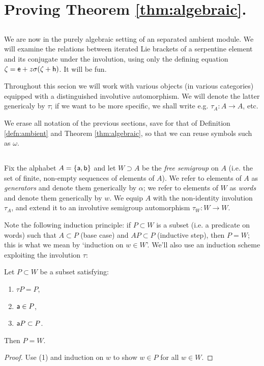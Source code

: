 \section{Proving Theorem \ref{thm:algebraic}.}
\label{sec:proving}
\subsection*{}
We are now in the purely algebraic setting of an separated ambient module.
We will examine the relations between iterated Lie brackets of a serpentine
element and its conjugate under the involution, using only the defining
equation $\zeta = \mathsf{e} + z \sigma(\zeta + \mathsf{h})$. It will be fun.

Throughout this secion we will work with various objects (in various
categories) equipped with a distinguished involutive automorphism. We will
denote the latter genericaly by $\tau$; if we want to be more specific, we shall
write e.g. $\tau_A : A \to A$, etc.

We erase all notation of the previous sections, save for that of
Definition \ref{defn:ambient} and Theorem \ref{thm:algebraic}, so that we can reuse symbols such as $\omega$.

\subsection{}
Fix the alphabet $A = \{\mathsf{a},\mathsf{b}\}$ and let $W\supset A$ be the \emph{free semigroup}
on $A$ (i.e. the set of finite, non-empty sequences of elements of $A$). We
refer to elements of $A$ as \emph{generators} and denote them generically by $\alpha$;
we refer to elements of $W$ as \emph{words} and denote them generically by $w$.
We equip $A$ with the non-identity involution $\tau_A$, and extend it to an
involutive semigroup automorphism $\tau_W:W\to W$. 

Note the following induction principle:
if $P\subset W$ is a subset (i.e. a predicate on words) such that $A \subset P$ (base case) and $AP \subset P$ (inductive step), 
then $P=W$; this is what we mean by `induction on $w\in W$'.
We'll also use an induction scheme exploiting the involution $\tau$:
\begin{lem} \label{lem:w-ind}
Let $P\subset W$ be a subset satisfying:
\begin{enumerate}
        \item $\tau P = P$,
        \item $\mathsf{a} \in P$,
        \item $\mathsf{a} P \subset P$.
\end{enumerate}
Then $P=W$.
\end{lem}
\begin{proof}
Use (1) and induction on $w$ to show $w\in P$ for all $w\in W$.
\end{proof}

